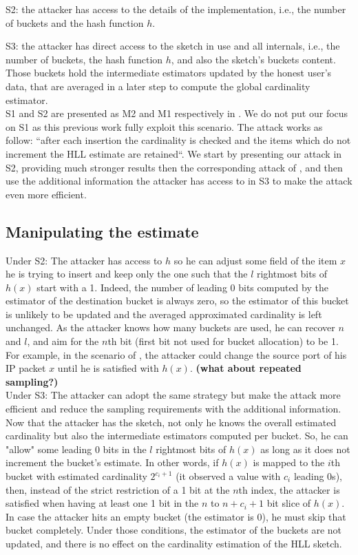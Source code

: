 \documentclass{IEEEtran}
\begin{document}
S2: the attacker has access to the details of the implementation, i.e., the number of buckets and the hash function $h$.

S3: the attacker has direct access to the sketch in use and all internals, i.e., the number of buckets, the hash function $h$, and also the sketch's buckets content. Those buckets hold the intermediate estimators updated by the honest user's data, that are averaged in a later step to compute the global cardinality estimator.\\

S1 and S2 are presented as M2 and M1 respectively in \cite{hllvuln}. We do not put our focus on S1 as this previous work fully exploit this scenario. The attack works as follow: ``after each insertion the cardinality is checked and the items which do not increment the HLL estimate are retained``. We start by presenting our attack in S2, providing much stronger results then the corresponding attack of \cite{hllvuln}, and then use the additional information the attacker has access to in S3 to make the attack even more efficient. 

\subsection{Manipulating the estimate}
Under S2: The attacker has access to $h$ so he can adjust some field of the item $x$ he is trying to insert and keep only the one such that the $l$ rightmost bits of $h(x)$ start with a 1. Indeed, the number of leading 0 bits computed by the estimator of the destination bucket is always zero, so the estimator of this bucket is unlikely to be updated and the averaged approximated cardinality is left unchanged. As the attacker knows how many buckets are used, he can recover $n$ and $l$, and aim for the $n$th bit (first bit not used for bucket allocation) to be 1. For example, in the scenario of \cite{portscanhll}, the attacker could change the source port of his IP packet $x$ until he is satisfied with $h(x)$. \textbf{(what about repeated sampling?)}\\

Under S3: The attacker can adopt the same strategy but make the attack more efficient and reduce the sampling requirements with the additional information. Now that the attacker has the sketch, not only he knows the overall estimated cardinality but also the intermediate estimators computed per bucket. So, he can "allow" some leading 0 bits in the $l$ rightmost bits of $h(x)$ as long as it does not increment the bucket's estimate. In other words, if $h(x)$ is mapped to the $i$th bucket with estimated cardinality $2^{c_i + 1}$ (it observed a value with $c_i$ leading 0s), then, instead of the strict restriction of a 1 bit at the $n$th index, the attacker is satisfied when having at least one 1 bit in the $n$ to $n+c_i + 1$ bit slice of $h(x)$. In case the attacker hits an empty bucket (the estimator is 0), he must skip that bucket completely. Under those conditions, the estimator of the buckets are not updated, and there is no effect on the cardinality estimation of the HLL sketch.
\end{document}
